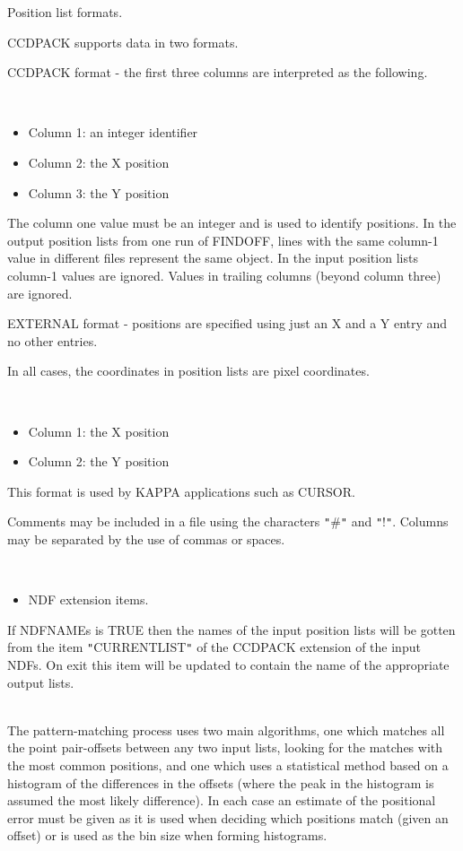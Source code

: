 \documentclass[twoside,11pt]{article}
\newcommand{\xref}[3]{#1}
\renewcommand{\_}{\texttt{\symbol{95}}}
\newcommand{\qt}[1]{{\tt "}#1{\tt "}}
\newcommand{\sstdiytopic}[2]{\item[#1:] \mbox{} \\[1.3ex] #2}
\newcommand{\sstitemlist}[1]{
  \mbox{} \\
  \vspace{-3.5ex}
  \begin{itemize}
     #1
  \end{itemize}
}
\newcommand{\sstitem}{\item}
\newcommand{\sstdiytopic}[2]{\item[{#1}] #2 }
\newcommand{\sstitemlist}[1]{
      \begin{itemize}
         #1
      \end{itemize}
      \\
   }
\newcommand{\sstitem}{\item}
\begin{document}
{{{         \sstitem
         Position list formats.

      }
        CCDPACK supports data in two formats.

        CCDPACK format - the first three columns are interpreted as the
        following.

      \sstitemlist{

         \sstitem
              Column 1: an integer identifier

         \sstitem
              Column 2: the X position

         \sstitem
              Column 3: the Y position

      }
        The column one value must be an integer and is used to identify
        positions.  In the output position lists from one run of FINDOFF,
        lines with the same column-1 value in different files represent
        the same object.  In the input position lists column-1 values
        are ignored.  Values in trailing columns (beyond column three)
        are ignored.

        EXTERNAL format - positions are specified using just an X
        and a Y entry and no other entries.

        In all cases, the coordinates in position lists are pixel
        coordinates.

      \sstitemlist{

         \sstitem
              Column 1: the X position

         \sstitem
              Column 2: the Y position

      }
        This format is used by KAPPA applications such as
        \xref{CURSOR}{sun95}{CURSOR}.

        Comments may be included in a file using the characters \qt{\#} and
        \qt{!}. Columns may be separated by the use of commas or spaces.

      \sstitemlist{

         \sstitem
         NDF extension items.

      }
        If NDFNAMEs is TRUE then the names of the input position lists
        will be gotten from the item \qt{CURRENT\_LIST} of the CCDPACK
        extension of the input NDFs. On exit this item will be updated
        to contain the name of the appropriate output lists.
   }
   \sstdiytopic{
      Notes on Algorithms
   } {
      The pattern-matching process uses two main algorithms, one which
      matches all the point pair-offsets between any two input lists,
      looking for the matches with the most common positions, and one
      which uses a statistical method based on a histogram of the
      differences in the offsets (where the peak in the histogram is
      assumed the most likely difference). In each case an estimate of
      the positional error must be given as it is used when deciding
      which positions match (given an offset) or is used as the bin
      size when forming histograms.

}}
\end{document}

